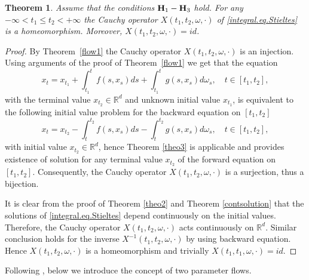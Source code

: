 \documentclass[10pt]{article}
\numberwithin{equation}{section} %
\newcommand{\R}{\ensuremath{\mathbb{R}}}
\newtheorem{theorem}{Theorem}[section]
{ \theorembodyfont{\normalfont} %
\newtheorem{example}[theorem]{Example}
\newtheorem{remark}[theorem]{Remark}
}
\begin{document}
 \begin{theorem}\label{cauchy.operator}
Assume that the conditions ${\textbf H}_1-{\textbf H}_3$ hold. 
 For any $-\infty< t_1\leq t_2<+\infty$ the Cauchy operator $X(t_1,t_2,\omega,\cdot)$ of  \eqref{integral.eq.Stieltes}  is a homeomorphism. Moreover, $X(t_1,t_2,\omega,\cdot)=id$.
 \end{theorem}
 \begin{proof}
 By Theorem~\ref{flow1} the Cauchy operator $X(t_1,t_2,\omega,\cdot)$ is an injection. Using arguments of the proof of Theorem~\ref{flow1} we get that the equation
 \begin{equation}\label{eqn.fw}
   x_t = x_{t_1} + \int_{t_1}^t f(s,x_s) ds +  \int_{t_1}^t g(s,x_s) d\omega_s, \quad t\in [t_1,t_2],   
\end{equation}
 with the terminal value $x_{t_2}\in\R^d$ and unknown initial value $x_{t_1}$,
 is equivalent to the following initial value problem for the backward equation on $[t_1,t_2]$
  \begin{equation}\label{eqn.bw}
   x_t = x_{t_2} - \int_t^{t_2} f(s,x_s) ds -  \int_t^{t_2} g(s,x_s) d\omega_s, \quad t\in [t_1,t_2],
\end{equation}
with initial value $x_{t_2}\in\R^d$,
  hence Theorem \ref{theo3} is applicable and provides existence of solution for any terminal value $x_{t_2}$ of the forward equation on $[t_1,t_2]$. Consequently, the Cauchy operator $X(t_1,t_2,\omega,\cdot)$ is a surjection, thus a bijection.
  
 It is clear from the proof of Theorem \ref{theo2} and Theorem \ref{contsolution} that the solutions of \eqref{integral.eq.Stieltes} depend continuously on the initial values. Therefore, the  Cauchy operator $X(t_1,t_2,\omega,\cdot)$ acts continuously on $\R^d$.  Similar conclusion holds for the inverse $X^{-1}(t_1,t_2,\omega,\cdot)$ by using backward equation. Hence $X(t_1,t_2,\omega,\cdot)$  is a homeomorphism and trivially $X(t_1,t_1,\omega,\cdot)=id$.
 \end{proof}
 \medskip
 Following \cite[page 114]{kunita}, below we introduce the concept of two parameter flows.
\end{document}
